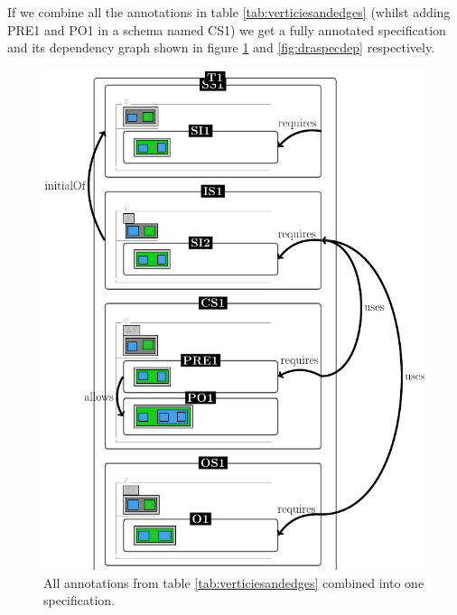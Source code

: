 If we combine all the annotations in table \ref{tab:verticiesandedges} (whilst adding PRE1 and PO1 in a schema named CS1) we get a fully annotated specification and its dependency graph shown in figure \ref{fig:draspec} and \ref{fig:draspecdep} respectively.

\begin{figure}[H]
\centering
\begin{minipage}{0.45\textwidth}
\centering
\includegraphics[scale=0.3]{Figures/Formalising/draspec.png}
\caption{All annotations from table \ref{tab:verticiesandedges} combined into one specification.  \label{fig:draspec}}
\end{minipage}\hfill
\begin{minipage}{0.45\textwidth}
\centering

\end{minipage}
\end{figure}
